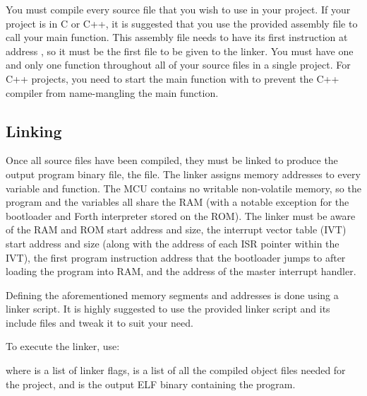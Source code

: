 \documentclass[11pt,pdftex,portrait,letterpaper]{article}
\begin{document}
You must compile every source file that you wish to use in your project. If your project is in C or C++, it is suggested that you use the provided  assembly file to call your main function. This assembly file needs to have its first instruction at address \texttt{\RamProgramStartAddress}, so it must be the first file to be given to the linker. You must have one and only one  function throughout all of your source files in a single project. For C++ projects, you need to start the main function with  to prevent the C++ compiler from name-mangling the main function.

\subsection{Linking}
Once all source files have been compiled, they must be linked to produce the output program binary file, the  file. The linker assigns memory addresses to every variable and function. The MCU contains no writable non-volatile memory, so the program and the variables all share the RAM (with a notable exception for the bootloader and Forth interpreter stored on the ROM). The linker must be aware of the RAM and ROM start address and size, the interrupt vector table (IVT) start address and size (along with the address of each ISR pointer within the IVT), the first program instruction address that the bootloader jumps to after loading the program into RAM, and the address of the master interrupt handler. 

Defining the aforementioned memory segments and addresses is done using a linker script. It is highly suggested to use the provided linker script  and its include files and tweak it to suit your need.

To execute the linker, use:

\noindent{}

\noindent where  is a list of linker flags,  is a list of all the compiled object files needed for the project, and  is the output ELF binary containing the program.
\end{document}
